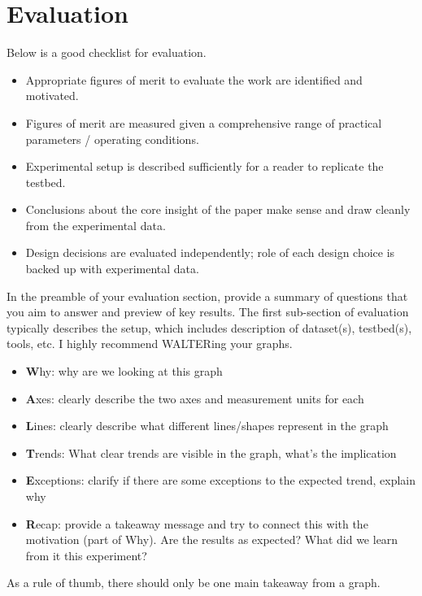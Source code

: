 \section{Evaluation}
\label{sec:eval}
Below is a good checklist for evaluation.
\begin{itemize}
    \item Appropriate figures of merit to evaluate the work are identified and motivated.
    \item Figures of merit are measured given a comprehensive range of practical parameters / operating conditions.
    \item Experimental setup is described sufficiently for a reader to replicate the testbed.
    \item Conclusions about the core insight of the paper make sense and draw cleanly from the experimental data.
    \item Design decisions are evaluated independently; role of each design choice is backed up with experimental data.
\end{itemize}

In the preamble of your evaluation section, provide a summary of questions that you aim to answer and preview of key results. The first sub-section of evaluation typically describes the setup, which includes description of dataset(s), testbed(s), tools, etc. I highly recommend WALTERing your graphs. 
\begin{itemize}
    \item \textbf{W}hy: why are we looking at this graph
    \item \textbf{A}xes: clearly describe the two axes and measurement units for each
    \item \textbf{L}ines: clearly describe what different lines/shapes represent in the graph
    \item \textbf{T}rends: What clear trends are visible in the graph, what's the implication
    \item \textbf{E}xceptions: clarify if there are some exceptions to the expected trend, explain why
    \item \textbf{R}ecap: provide a takeaway message and try to connect this with the motivation (part of Why).  Are the results as expected? What did we learn from it this experiment?
\end{itemize}

As a rule of thumb, there should only be one main takeaway from a graph. 





